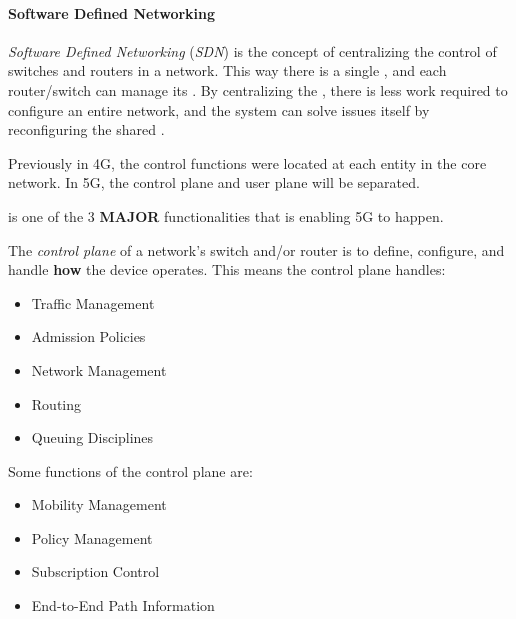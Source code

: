 \paragraph{Software Defined Networking}\label{par:SDN}
\begin{definition}\label{def:Software_Defined_Networking}\label{def:SDN}
  \emph{Software Defined Networking} (\emph{SDN}) is the concept of centralizing the control of switches and routers in a network.
  This way there is a single , and each router/switch can manage its .
  By centralizing the , there is less work required to configure an entire network, and the system can solve issues itself by reconfiguring the shared .

  Previously in 4G, the control functions were located at each entity in the core network.
  In 5G, the control plane and user plane will be separated.

  \begin{remark}\label{rmk:SDN_Core_5G}
     is one of the 3 \textbf{MAJOR} functionalities that is enabling 5G to happen.
  \end{remark}
\end{definition}

\begin{definition}\label{def:Control_Plane}
  The \emph{control plane} of a network's switch and/or router is to define, configure, and handle \textbf{how} the device operates.
  This means the control plane handles:
  \begin{itemize}[noitemsep]
  \item Traffic Management
  \item Admission Policies
  \item Network Management
  \item Routing
  \item Queuing Disciplines
  \end{itemize}

  Some functions of the control plane are:
  \begin{itemize}[noitemsep]
  \item Mobility Management
  \item Policy Management
  \item Subscription Control
  \item End-to-End Path Information
  \end{itemize}
\end{definition}

